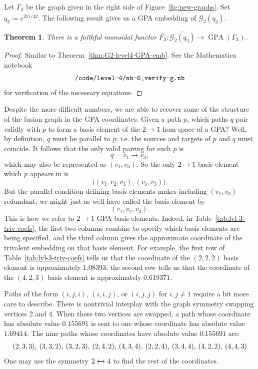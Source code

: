 \documentclass[pdflatex,sn-mathphys-num]{sn-jnl}%
\theoremstyle{thmstyleone}%
\newtheorem{theorem}{Theorem}
\theoremstyle{thmstyletwo}%
\theoremstyle{thmstylethree}%
\newcommand{\GG}{\mathcal{G}}
\newcommand{\ol}{\overline}
\DeclareMathOperator{\GPA}{GPA}
\begin{document}
Let $\Gamma_3$ be the graph given in the right side of Figure~\ref{fig:new-graphs}.
Set $q_3 \coloneq e^{2\pi i/42}$.
The following result gives us a GPA embedding of $\ol{\GG_2(q_3)}$.

\begin{theorem}\label{thm:G2-level3-GPA-emb}
    There is a faithful monoidal functor $\ol{F_3}: \ol{\GG_2(q_3)} \to \GPA(\Gamma_3)$.
\end{theorem}
\begin{proof}
    Similar to Theorem~\ref{thm:G2-level4-GPA-emb}.
    See the Mathematica notebook \[\verb|/code/level-4/nb-6_verify-g.nb|\] for 
    verification of the necessary equations.
\end{proof}

Despite the more difficult numbers, we are able to recover some of the structure of the fusion graph in the GPA coordinates.
Given a path $p$, which paths $q$ pair validly with $p$ to form a basis element of the $2\to 1$ hom-space of a GPA? 
Well, by definition, $q$ must be parallel to $p$; i.e. the sources and targets of $p$ and $q$ must coincide. 
It follows that the only valid pairing for such $p$ is
\[
    q = v_1 \longrightarrow v_3,
\]
which may also be represented as $(v_1,v_3)$. 
So the only $2\to 1$ basis element which $p$ appears in is
\[
    \big( (v_1,v_2,v_3), (v_1,v_3) \big).
\]
But the parallel condition defining basis elements makes including $(v_1,v_3)$ redundant; 
we might just as well have called the basis element by 
\[
    (v_1,v_2,v_3).
\]
This is how we refer to $2\to 1$ GPA basis elements. 
Indeed, in Table~\ref{tab:lvl-3-triv-coefs}, the first two columns combine to specify which basis elements are being specified, 
and the third column gives the approximate coordinate of the trivalent embedding on that basis element. 
For example, the first row of Table~\ref{tab:lvl-3-triv-coefs} tells us that the 
coordinate of the $(2,2,2)$ basis element is approximately $1.08393$; 
the second row tells us that the coordinate of the $(4,2,3)$ basis element is approximately $0.619371$. 

Paths of the form $(i,j,i)$, $(i,i,j)$, or $(i,j,j)$ for $i,j\neq1$ require a bit more care to describe. 
There is nontrivial interplay with the graph symmetry swapping vertices 2 and 4. 
When these two vertices are swapped, a path whose coordinate has absolute value $0.155691$ is sent to 
one whose coordinate has absolute value $1.69414$. 
The nine paths whose coordinates have absolute value $0.155691$ are:
\[
    (2,3,3),\hspace{0.2em} (3,3,2),\hspace{0.2em} (3,2,3),\hspace{0.2em} (2,4,2),\hspace{0.2em} (4,3,4),\hspace{0.2em} (2,2,4),\hspace{0.2em} (3,4,4),\hspace{0.2em} (4,2,2),\hspace{0.2em} (4,4,3) 
\]
One may use the symmetry $2 \xleftrightarrow{} 4$ to find the rest of the coordinates.
\end{document}
